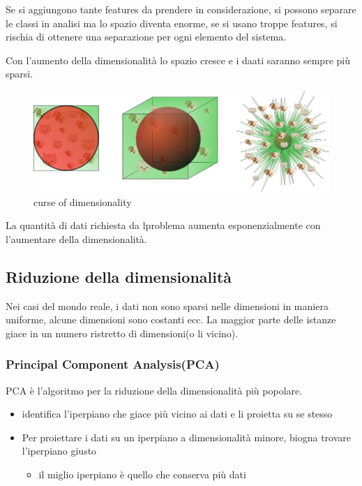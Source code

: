 Se si aggiungono tante features da prendere in considerazione, si possono separare
le classi in analisi ma lo spazio diventa enorme, se si usano troppe features,
si rischia di ottenere una separazione per ogni elemento del sistema.

Con l'aumento della dimensionalità lo spazio cresce e i daati saranno sempre più
sparsi.

\begin{figure}[H]
    \centering
    \includegraphics[width=0.6\linewidth]{imgs/curse-of-dimensionality}
    \caption{curse of dimensionality}
    \label{fig:curse_of_dimensionality}
\end{figure}
La quantità di dati richiesta da lproblema aumenta esponenzialmente con l'aumentare
della dimensionalità.

\subsection{Riduzione della dimensionalità}
Nei casi del mondo reale, i dati non sono sparsi nelle dimensioni in maniera uniforme,
alcune dimensioni sono costanti ecc.
La maggior parte delle istanze giace in un numero ristretto di dimensioni(o li vicino).


\subsubsection{Principal Component Analysis(PCA)}

PCA è l'algoritmo per la riduzione della dimensionalità più popolare.

\begin{itemize}
    \item identifica l'iperpiano che giace più vicino ai dati e li proietta su se stesso
    \item Per proiettare i dati su un iperpiano a dimensionalità minore, biogna trovare l'iperpiano giusto
    \begin{itemize}
        \item il miglio iperpiano è quello che conserva più dati
    \end{itemize}
\end{itemize}

